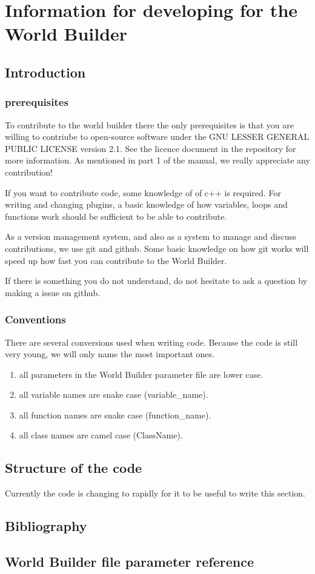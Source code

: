 \documentclass{book}
\newcommand{\WB}{{World Builder}}
\begin{document}
\part{Information for developing for the World Builder}
\chapter{Introduction}
\section{prerequisites}
To contribute to the world builder there the only prerequisites is that you are willing to contriube to open-source software under the GNU LESSER GENERAL PUBLIC LICENSE version 2.1. See the licence document in the repository for more information. As mentioned in part 1 of the manual, we really appreciate any contribution!

If you want to contribute code, some knowledge of of c++ is required. For writing and changing plugins, a basic knowledge of how variables, loops and functions work should be sufficient to be able to contribute. 

As a version management system, and also as a system to manage and discuss contributions, we use git and github. Some basic knowledge on how git works will speed up how fast you can contribute to the \WB{}.

If there is something you do not understand, do not hesitate to ask a question by making a issue on github.

\section{Conventions}
There are several conversions used when writing code. Because the code is still very young, we will only name the most important ones. 
\begin{enumerate}
    \item all parameters in the \WB{} parameter file are lower case.
    \item all variable names are snake case (variable\_name).
    \item all function names are snake case (function\_name).
    \item all class names are camel case (ClassName).
\end{enumerate}
\chapter{Structure of the code}
Currently the code is changing to rapidly for it to be useful to write this section.
\chapter*{Bibliography}



\appendix
\chapter{\WB{} file parameter reference}
\label{chapter:WB_file_parameter_reference}

\end{document}
